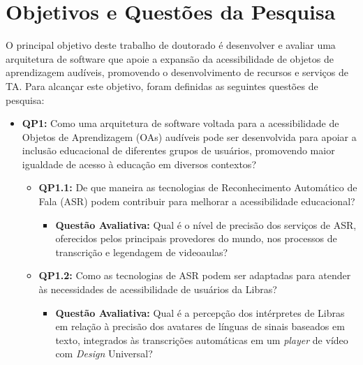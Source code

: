 \section{Objetivos e Questões da Pesquisa}

O principal objetivo deste trabalho de doutorado é desenvolver e avaliar uma arquitetura de software que apoie a expansão da acessibilidade de objetos de aprendizagem audíveis, promovendo o desenvolvimento de recursos e serviços de TA. Para alcançar este objetivo, foram definidas as seguintes questões de pesquisa:

\begin{itemize}
    \item \textbf{QP1:} Como uma arquitetura de software voltada para a acessibilidade de Objetos de Aprendizagem (OAs) audíveis pode ser desenvolvida para apoiar a inclusão educacional de diferentes grupos de usuários, promovendo maior igualdade de acesso à educação em diversos contextos?
    
    \begin{itemize}
        \item \textbf{QP1.1:} De que maneira as tecnologias de Reconhecimento Automático de Fala (ASR) podem contribuir para melhorar a acessibilidade educacional?
        
        \begin{itemize}
            \item \textbf{Questão Avaliativa:} Qual é o nível de precisão dos serviços de ASR, oferecidos pelos principais provedores do mundo, nos processos de transcrição e legendagem de videoaulas?
        \end{itemize}
        
        \item \textbf{QP1.2:} Como as tecnologias de ASR podem ser adaptadas para atender às necessidades de acessibilidade de usuários da Libras?
        
        \begin{itemize}
            \item \textbf{Questão Avaliativa:} Qual é a percepção dos intérpretes de Libras em relação à precisão dos avatares de línguas de sinais baseados em texto, integrados às transcrições automáticas em um \textit{player} de vídeo com \textit{Design} Universal?
        \end{itemize}
    
    \end{itemize}

\end{itemize}

